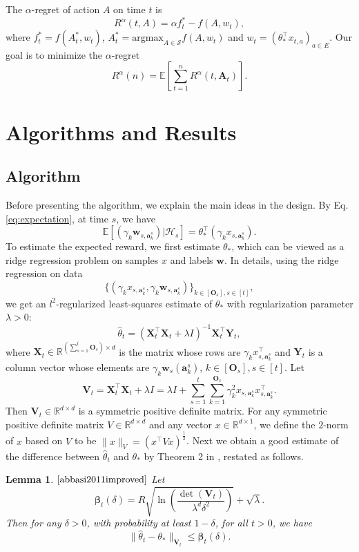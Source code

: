 \documentclass{article}
\newcommand{\bbeta}{\boldsymbol{\beta}}
\newcommand{\EE}{\mathbb{E}}
\newcommand{\RR}{\mathbb{R}}
\newcommand{\bA}{\mathbf{A}}
\newcommand{\ba}{\mathbf{a}}
\newcommand{\bO}{\mathbf{O}}
\newcommand{\bV}{\mathbf{V}}
\newcommand{\bw}{\mathbf{w}}
\newcommand{\bX}{\mathbf{X}}
\newcommand{\bY}{\mathbf{Y}}
\newcommand{\cH}{\mathcal{H}}
\newcommand{\cS}{\mathcal{S}}
\newcommand{\argmax}{\mathrm{argmax}}
\newcommand{\norm}[1]{\| #1 \|}
\newtheorem{lemma}[theorem]{Lemma}%
\begin{document}
The $\alpha$-regret of action $A$ on time $t$ is
$$
R^{\alpha}(t, A) = \alpha f_t^{\ast} - f(A, w_t),
$$
where $f_t^{\ast} = f(A_t^*, w_t)$, $A_t^* = \argmax_{A\in\cS} f(A, w_t)$ and $w_t = (\theta_{\ast}^{\top}x_{t,a})_{a \in E}$. Our goal is to minimize the $\alpha$-regret
$$
R^{\alpha}(n) = \EE[ \sum_{t=1}^n R^{\alpha}(t, \bA_t)].
$$
	
\section{Algorithms and Results}

\subsection{Algorithm}

Before presenting the algorithm, we explain the main ideas in the design. By Eq.\eqref{eq:expectation}, at time $s$, we have 
$$
  \EE[(\gamma_k \bw_{s,\ba_k^s}) | \cH_{s}] = \theta_*^{\top} (\gamma_k x_{s,\ba_k^s}).
$$
To estimate the expected reward, we first estimate $\theta_{\ast}$, which can be viewed as a ridge regression problem on samples $x$ and labels $\bw$. In details, using the ridge regression on data 
$$
  \{(\gamma_k x_{s,\ba_k^s}, \gamma_k \bw_{s,\ba_k^s})\}_{k \in[\bO_s], s\in[t]},
$$
we get an $l^2$-regularized least-squares estimate of $\theta_*$ with regularization parameter $\lambda > 0$:
\begin{equation}
  \hat{\theta}_t = (\bX_t^{\top}\bX_t + \lambda I)^{-1} \bX_t^{\top} \bY_t,
\end{equation}
where $\bX_t \in \RR^{(\sum_{s=1}^{t}\bO_s) \times d}$ is the matrix whose rows are $\gamma_k x_{s,\ba_k^s}^{\top}$ and $\bY_t$ is a column vector whose elements are $\gamma_k \bw_s(\ba_k^s)$, $k \in[\bO_s], s\in[t]$. Let
$$
  \bV_t = \bX_t^{\top} \bX_t + \lambda I = \lambda I + \sum_{s=1}^{t} \sum_{k=1}^{\bO_s} \gamma_k^2 x_{s,\ba_k^s}x_{s,\ba_k^s}^{\top}.
$$
Then $\bV_t \in \RR^{d \times d}$ is a symmetric positive definite matrix. For any symmetric positive definite matrix $V \in \RR^{d \times d} $ and any vector $x \in \RR^{d \times 1}$, we define the $2$-norm of $x$ based on $V$ to be $\norm{x}_V = (x^{\top} V x)^{\frac{1}{2}}$. Next we obtain a good estimate of the difference between $\hat{\theta}_t$ and $\theta_*$ by Theorem 2 in \cite{abbasi2011improved}, restated as follows.

\begin{lemma} $\mathrm{\cite{abbasi2011improved}}$ %
  \label{thm:theta_estimate}
  Let 
  \begin{equation}
    \bbeta_{t}(\delta) = R\sqrt{\ln\left(\frac{\det(\bV_{t})}{\lambda^d \delta^2}\right)} + \sqrt{\lambda}. \label{eq:definebeta}
  \end{equation}
  Then for any $\delta > 0$, with probability at least $1 - \delta$, for all $t > 0$, we have
  \begin{equation}
    \label{eq:estimateTheta}
    \norm{\hat{\theta}_t - \theta_{\ast}}_{\bV_{t}} \leq \bbeta_{t}(\delta).
  \end{equation}
\end{lemma}
\end{document}
